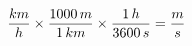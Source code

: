 \documentclass[preview]{standalone}
\begin{document}
\begin{align*}
\special{dvisvgm:raw <g id='unique000'>}\frac{km}{h} \times \frac{1000\,m}{1\,km} \times \frac{1\,h}{3600\,s} = \frac{m}{s}\special{dvisvgm:raw </g>}
\end{align*}
\end{document}
